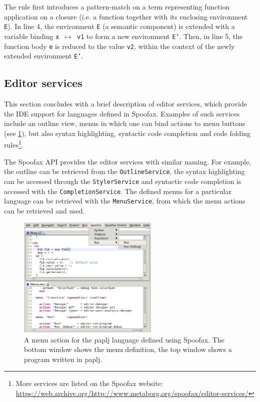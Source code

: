 The rule first introduces a pattern-match on a term representing function
application on a closure (i.e. a function together with its enclosing
environment \texttt{E}). In line 4, the environment \texttt{E} (a semantic
component) is extended with a variable binding \texttt{x $\mapsto$ v1} to form a
new environment \texttt{E'}. Then, in line 5, the function body \texttt{e} is
reduced to the value \texttt{v2}, within the context of the newly extended
environment \texttt{E'}.

\subsection{Editor services}
\label{ssec:editor-serv}
This section concludes with a brief description of editor services,
which provide the IDE support for languages defined in
Spoofax. Examples of such services include an outline view, menus in
which one can bind actions to menu buttons (see
\cref{fig:menu-actions}), but also syntax highlighting, syntactic code
completion and code folding rules\footnote{More services are
listed on the Spoofax website:
\url{https://web.archive.org/http://www.metaborg.org/spoofax/editor-services/}}.

The Spoofax API provides the editor services with similar naming. For
example, the outline can be retrieved from the \texttt{OutlineService}, the
syntax highlighting can be accessed through the \texttt{StylerService} and
syntactic code completion is accessed with the
\texttt{CompletionService}. The defined menus for a particular language can
be retrieved with the \texttt{MenuService}, from which the menu actions can
be retrieved and used.

\begin{figure}[bt]
\centering
\includegraphics[width=0.6\textwidth]{./img/menu-actions.png}
\caption{\label{fig:menu-actions}
A menu action for the paplj language defined using Spoofax. The bottom window shows the menu definition, the top window shows a program written in paplj.}
\end{figure}

